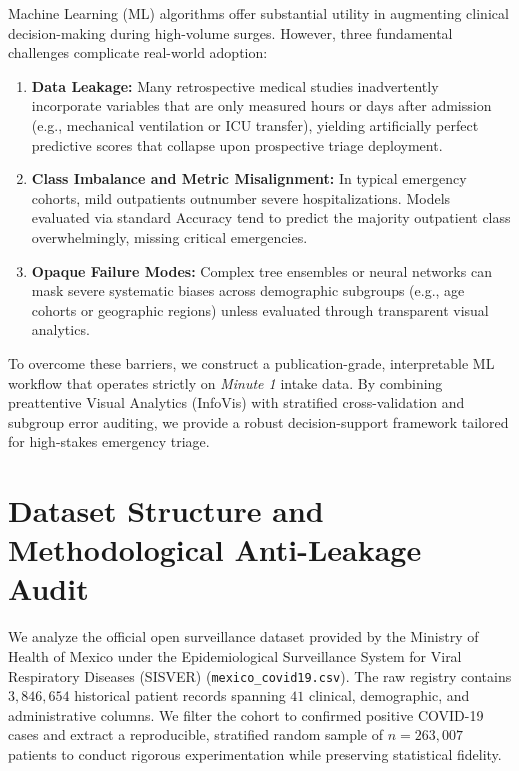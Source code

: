 \documentclass{article}
\begin{document}
Machine Learning (ML) algorithms offer substantial utility in augmenting clinical decision-making during high-volume surges. However, three fundamental challenges complicate real-world adoption:
\begin{enumerate}
    \item \textbf{Data Leakage:} Many retrospective medical studies inadvertently incorporate variables that are only measured hours or days after admission (e.g., mechanical ventilation or ICU transfer), yielding artificially perfect predictive scores that collapse upon prospective triage deployment.
    \item \textbf{Class Imbalance and Metric Misalignment:} In typical emergency cohorts, mild outpatients outnumber severe hospitalizations. Models evaluated via standard Accuracy tend to predict the majority outpatient class overwhelmingly, missing critical emergencies.
    \item \textbf{Opaque Failure Modes:} Complex tree ensembles or neural networks can mask severe systematic biases across demographic subgroups (e.g., age cohorts or geographic regions) unless evaluated through transparent visual analytics.
\end{enumerate}

To overcome these barriers, we construct a publication-grade, interpretable ML workflow that operates strictly on \emph{Minute 1} intake data. By combining preattentive Visual Analytics (InfoVis) with stratified cross-validation and subgroup error auditing, we provide a robust decision-support framework tailored for high-stakes emergency triage.

\section{Dataset Structure and Methodological Anti-Leakage Audit}
\label{sec:data}

We analyze the official open surveillance dataset provided by the Ministry of Health of Mexico under the Epidemiological Surveillance System for Viral Respiratory Diseases (SISVER) (\texttt{mexico\_covid19.csv}). The raw registry contains $3,846,654$ historical patient records spanning $41$ clinical, demographic, and administrative columns. We filter the cohort to confirmed positive COVID-19 cases and extract a reproducible, stratified random sample of $n=263,007$ patients to conduct rigorous experimentation while preserving statistical fidelity.
\end{document}
